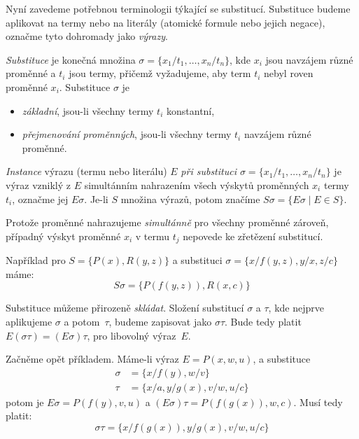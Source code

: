 Nyní zavedeme potřebnou terminologii týkající se substitucí. Substituce budeme aplikovat na termy nebo na literály (atomické formule nebo jejich negace), označme tyto dohromady jako \emph{výrazy}.

\begin{definition}[Substituce]
    \emph{Substituce} je konečná množina $\sigma=\{x_1/t_1,\dots,x_n/t_n\}$, kde $x_i$ jsou navzájem různé proměnné a $t_i$ jsou termy, přičemž vyžadujeme, aby term $t_i$ nebyl roven proměnné $x_i$. Substituce $\sigma$ je
    \begin{itemize}
        \item \emph{základní}, jsou-li všechny termy $t_i$ konstantní,
        \item \emph{přejmenování proměnných}, jsou-li všechny termy $t_i$ navzájem různé proměnné.
    \end{itemize}
    \emph{Instance} výrazu (termu nebo literálu) $E$ \emph{při substituci $\sigma=\{x_1/t_1,\dots,x_n/t_n\}$} je výraz vzniklý z $E$ simultánním nahrazením všech výskytů proměnných $x_i$ termy $t_i$, označme jej $E\sigma$. Je-li $S$ množina výrazů, potom značíme $S\sigma=\{E\sigma\mid E\in S\}$.
\end{definition}

Protože proměnné nahrazujeme \emph{simultánně} pro všechny proměnné zároveň, případný výskyt proměnné $x_i$ v termu $t_j$ nepovede ke zřetězení substitucí.

\begin{example}
Například pro $S=\{P(x),R(y,z)\}$ a substituci $\sigma=\{x/f(y,z),y/x,z/c\}$ máme:
$$
S\sigma=\{P(f(y,z)),R(x,c)\}
$$
\end{example}

Substituce můžeme přirozeně \emph{skládat}. Složení substitucí $\sigma$ a $\tau$, kde nejprve aplikujeme $\sigma$ a potom~$\tau$, budeme zapisovat jako $\sigma\tau$. Bude tedy platit $E(\sigma\tau)=(E\sigma)\tau$, pro libovolný výraz~$E$.

\begin{example}\label{example:compose-substitutions}
    Začněme opět příkladem. Máme-li výraz $E=P(x,w,u)$, a substituce \begin{align*}
        \sigma&=\{x/f(y),w/v\}\\
        \tau&=\{x/a,y/g(x),v/w,u/c\}
    \end{align*}
    potom je $E\sigma=P(f(y),v,u)$ a $(E\sigma)\tau=P(f(g(x)),w,c)$.
    Musí tedy platit:
    $$
    \sigma\tau=\{x/f(g(x)),y/g(x),v/w,u/c\}
    $$
\end{example}

